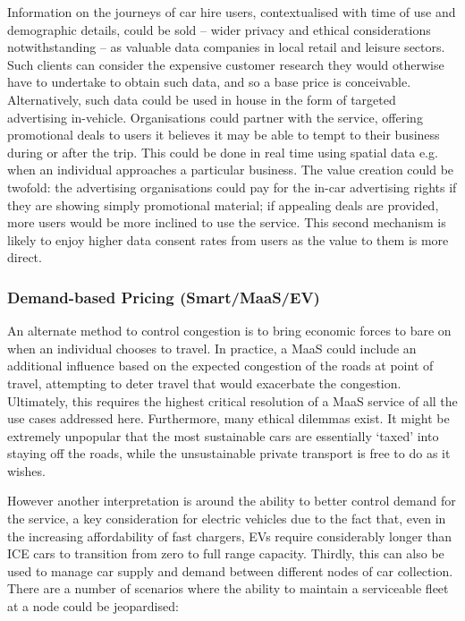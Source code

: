 \documentclass[journal]{IEEEtran}
\begin{document}
Information on the journeys of car hire users, contextualised with
time of use and demographic details, could be sold -- wider privacy
and ethical considerations notwithstanding -- as valuable data
companies in local retail and leisure sectors. Such clients can
consider the expensive customer research they would otherwise have to
undertake to obtain such data, and so a base price is conceivable.
Alternatively, such data could be used in house in the form of
targeted advertising in-vehicle. Organisations could partner with the
service, offering promotional deals to users it believes it may be
able to tempt to their business during or after the trip. This could
be done in real time using spatial data e.g. when an individual
approaches a particular business. The value creation could be twofold:
the advertising organisations could pay for the in-car advertising
rights if they are showing simply promotional material; if appealing
deals are provided, more users would be more inclined to use the
service. This second mechanism is likely to enjoy higher data consent
rates from users as the value to them is more direct.


\subsubsection{Demand-based Pricing (Smart/MaaS/EV)}

An alternate method to control congestion is to bring economic forces
to bare on when an individual chooses to travel. In practice, a MaaS
could include an additional influence based on the expected congestion
of the roads at point of travel, attempting to deter travel that would
exacerbate the congestion. Ultimately, this requires the highest
critical resolution of a MaaS service of all the use cases addressed
here. Furthermore, many ethical dilemmas exist. It might be extremely
unpopular that the most sustainable cars are essentially `taxed' into
staying off the roads, while the unsustainable private transport is
free to do as it wishes.

However another interpretation is around the ability to better control
demand for the service, a key consideration for electric vehicles due
to the fact that, even in the increasing affordability of fast
chargers, EVs require considerably longer than ICE cars to transition
from zero to full range capacity. Thirdly, this can also be used to
manage car supply and demand between different nodes of car
collection. There are a number of scenarios where the ability to
maintain a serviceable fleet at a node could be jeopardised:
\end{document}
